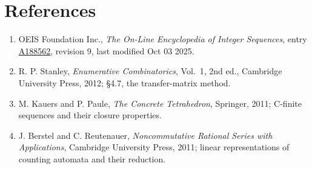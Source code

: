 \documentclass[11pt]{article}
\theoremstyle{definition}
\begin{document}
\section{References}

\begin{enumerate}

\item OEIS Foundation Inc., \emph{The On-Line Encyclopedia of Integer Sequences}, entry \href{https://oeis.org/A188562}{A188562}, revision 9, last modified Oct 03 2025.

\item R. P. Stanley, \emph{Enumerative Combinatorics}, Vol.~1, 2nd ed., Cambridge University Press, 2012; \S4.7, the transfer-matrix method.

\item M. Kauers and P. Paule, \emph{The Concrete Tetrahedron}, Springer, 2011; C-finite sequences and their closure properties.

\item J. Berstel and C. Reutenauer, \emph{Noncommutative Rational Series with Applications}, Cambridge University Press, 2011; linear representations of counting automata and their reduction.

\end{enumerate}
\end{document}
